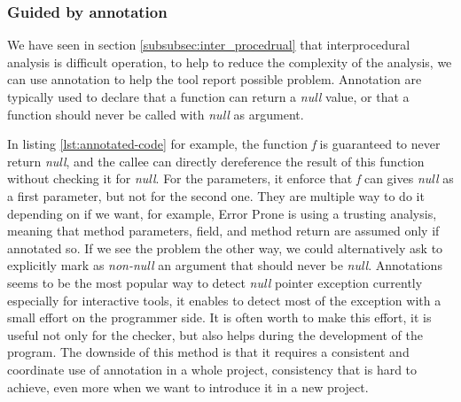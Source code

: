 \subsubsection{Guided by annotation}
\label{subsubsec:guided_by_annotation}

We have seen in section \ref{subsubsec:inter_procedrual} that interprocedural analysis is difficult operation, to help to reduce the complexity of the analysis, we can use annotation to help the tool report possible problem. Annotation are typically used to declare that a function can return a \emph{null} value, or that a function should never be called with \emph{null} as argument.



In listing \ref{lst:annotated-code} for example, the function \emph{f} is guaranteed to never return \emph{null}, and the callee can directly dereference the result of this function without checking it for \emph{null}. 
For the parameters, it enforce that \emph{f} can gives \emph{null} as a first parameter, but not for the second one.\newline
They are multiple way to do it depending on if we want, for example, Error Prone is using a trusting analysis, meaning that method parameters, field, and method return are assumed \nullable{} only if annotated so. 
If we see the problem the other way, we could alternatively ask to explicitly mark as \emph{non-null} an argument that should never be \emph{null}.\newline
Annotations seems to be the most popular way to detect \emph{null} pointer exception currently especially for interactive tools, it enables to detect most of the exception with a small effort on the programmer side. 
It is often worth to make this effort, it is useful not only for the checker, but also helps during the development of the program. 
The downside of this method is that it requires a consistent and coordinate use of annotation in a whole project, consistency that is hard to achieve, even more when we want to introduce it in a new project.

